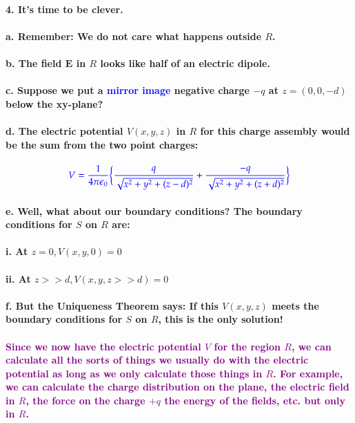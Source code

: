 \documentclass{article}
\begin{document}
\paragraph{4. It's time to be clever.}
\paragraph{\indent a. Remember: We do not care what happens outside $R$.}
\paragraph{\indent b. The field $\boldsymbol{E}$ in $R$ looks like half of an electric dipole.}
\paragraph{\indent c. Suppose we put a \textcolor{blue}{mirror image} negative charge $-q$ at $z=(0,0,-d)$ below the xy-plane?}
\paragraph{\indent d. The electric potential $V(x,y,z)$ in $R$ for this charge assembly would be the sum from the two point charges:}
\begin{equation*}
    \textcolor{blue}{V=\frac{1}{4\pi\epsilon_0}\bigg\{ \frac{q}{\sqrt{x^2+y^2+(z-d)^2}}+\frac{-q}{\sqrt{x^2+y^2+(z+d)^2}}\bigg\} }
\end{equation*}
\paragraph{\indent e. Well, what about our boundary conditions? The boundary conditions for $S$ on $R$ are:}
\paragraph{\indent \indent i. At $z=0, V(x,y,0)=0$}
\paragraph{\indent \indent ii. At $z>>d, V(x,y,z>>d)=0$}
\paragraph{\indent f. But the Uniqueness Theorem says: If this $V(x,y,z)$ meets the boundary conditions for $S$ on $R$, this is the only solution!}
\paragraph{\textcolor{purple}{Since we now have the electric potential $V$ for the region $R$, we can calculate all the sorts of things we usually do with the electric potential \textbf{as long as we only calculate those things in $R$}. For example, we can calculate the charge distribution on the plane, the electric field in $R$, the force on the charge $+q$ the energy of the fields, etc. \textbf{but only in} $R$.}}
\end{document}
